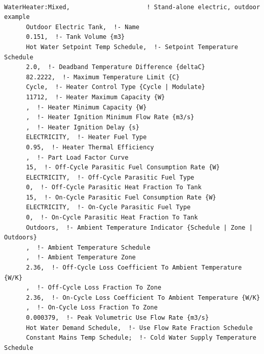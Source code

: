 \begin{lstlisting}

WaterHeater:Mixed,                     ! Stand-alone electric, outdoor example
      Outdoor Electric Tank,  !- Name
      0.151,  !- Tank Volume {m3}
      Hot Water Setpoint Temp Schedule,  !- Setpoint Temperature Schedule
      2.0,  !- Deadband Temperature Difference {deltaC}
      82.2222,  !- Maximum Temperature Limit {C}
      Cycle,  !- Heater Control Type {Cycle | Modulate}
      11712,  !- Heater Maximum Capacity {W}
      ,  !- Heater Minimum Capacity {W}
      ,  !- Heater Ignition Minimum Flow Rate {m3/s}
      ,  !- Heater Ignition Delay {s}
      ELECTRICITY,  !- Heater Fuel Type
      0.95,  !- Heater Thermal Efficiency
      ,  !- Part Load Factor Curve
      15,  !- Off-Cycle Parasitic Fuel Consumption Rate {W}
      ELECTRICITY,  !- Off-Cycle Parasitic Fuel Type
      0,  !- Off-Cycle Parasitic Heat Fraction To Tank
      15,  !- On-Cycle Parasitic Fuel Consumption Rate {W}
      ELECTRICITY,  !- On-Cycle Parasitic Fuel Type
      0,  !- On-Cycle Parasitic Heat Fraction To Tank
      Outdoors,  !- Ambient Temperature Indicator {Schedule | Zone | Outdoors}
      ,  !- Ambient Temperature Schedule
      ,  !- Ambient Temperature Zone
      2.36,  !- Off-Cycle Loss Coefficient To Ambient Temperature {W/K}
      ,  !- Off-Cycle Loss Fraction To Zone
      2.36,  !- On-Cycle Loss Coefficient To Ambient Temperature {W/K}
      ,  !- On-Cycle Loss Fraction To Zone
      0.000379,  !- Peak Volumetric Use Flow Rate {m3/s}
      Hot Water Demand Schedule,  !- Use Flow Rate Fraction Schedule
      Constant Mains Temp Schedule;  !- Cold Water Supply Temperature Schedule





\end{lstlisting}
